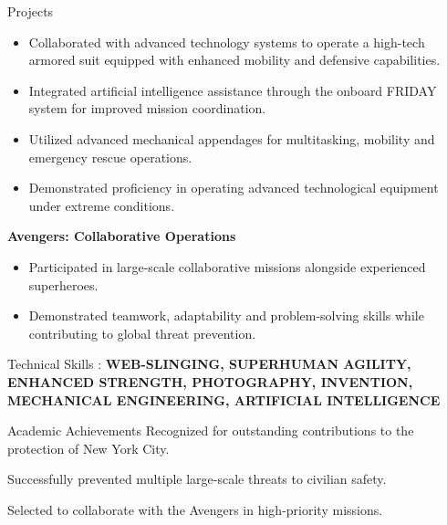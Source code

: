 \documentclass{resume}
\begin{document}
\begin{rSection}{Projects}
    \begin{itemize}
        \vspace{-0.3cm}\item Collaborated with advanced technology systems to operate a high-tech armored suit equipped with enhanced mobility and defensive capabilities.
        \vspace{-0.3cm}\item Integrated artificial intelligence assistance through the onboard FRIDAY system for improved mission coordination.
        \vspace{-0.3cm}\item Utilized advanced mechanical appendages for multitasking, mobility and emergency rescue operations.
		\vspace{-0.3cm}\item Demonstrated proficiency in operating advanced technological equipment under extreme conditions.
\end{itemize}

{\bf Avengers: Collaborative Operations}
    \begin{itemize}
        \vspace{-0.3cm}\item Participated in large-scale collaborative missions alongside experienced superheroes.
        \vspace{-0.3cm}\item Demonstrated teamwork, adaptability and problem-solving skills while contributing to global threat prevention.

    \end{itemize}

\end{rSection}

\begin{rSection}{Technical Skills :}
{\bf WEB-SLINGING, SUPERHUMAN AGILITY, ENHANCED STRENGTH, PHOTOGRAPHY, INVENTION, MECHANICAL ENGINEERING, ARTIFICIAL INTELLIGENCE}

\end{rSection}

\begin{rSection}{Academic Achievements} 
 Recognized for outstanding contributions to the protection of New York City.
\item Successfully prevented multiple large-scale threats to civilian safety.
\item Selected to collaborate with the Avengers in high-priority missions.
\end{rSection}
\end{document}
